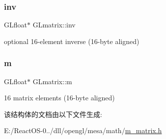 \subsubsection{\texorpdfstring{inv}{inv}}
{\footnotesize\ttfamily G\+Lfloat$\ast$ G\+Lmatrix\+::inv}

optional 16-\/element inverse (16-\/byte aligned) \mbox{\label{struct_g_lmatrix_aed91ed72e8180733f0deb2807bf9afc5}} 
\subsubsection{\texorpdfstring{m}{m}}
{\footnotesize\ttfamily G\+Lfloat$\ast$ G\+Lmatrix\+::m}

16 matrix elements (16-\/byte aligned) 

该结构体的文档由以下文件生成\+:\begin{DoxyCompactItemize}
\item 
E\+:/\+React\+O\+S-\/0../dll/opengl/mesa/math/\hyperlink{m__matrix_8h}{m\+\_\+matrix.\+h}\end{DoxyCompactItemize}

